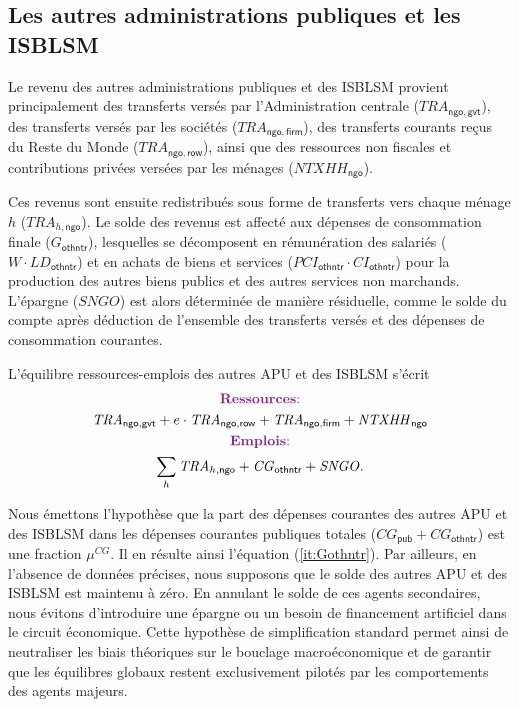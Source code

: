 \documentclass[11pt,a4paper]{article}
\newcommand{\gvt}{\mathsf{gvt}}
\newcommand{\firm}{\mathsf{firm}}
\newcommand{\ngo}{\mathsf{ngo}}
\newcommand{\row}{\mathsf{row}}
\newcommand{\CI}{\mathit{CI}}
\newcommand{\CG}{\mathit{CG}}
\newcommand{\NTXHH}{\mathit{NTXHH}}
\newcommand{\LD}{\mathit{LD}}
\newcommand{\othntr}{\mathsf{othntr}}
\newcommand{\SNGO}{\mathit{SNGO}}
\newcommand{\PCI}{\mathit{PCI}}
\newcommand{\TRA}{\mathit{TRA}}
\newcommand{\pub}{\mathsf{pub}}
\newcommand{\TR}{\mathit{TRA}}
\begin{document}
	\subsection{Les autres administrations publiques et les ISBLSM}
	Le revenu des autres administrations publiques et des ISBLSM provient principalement des transferts versés par l'Administration centrale ($\TR_{\ngo,\gvt}$), des transferts versés par les sociétés ($\TR_{\ngo,\firm}$), des transferts courants reçus du Reste du Monde ($\TR_{\ngo,\row}$), ainsi que des ressources non fiscales et contributions privées versées par les ménages ($\NTXHH_{\ngo}$).
	
	Ces revenus sont ensuite redistribués sous forme de transferts vers chaque ménage $h$ ($\TRA_{h,\ngo}$). Le solde des revenus est affecté aux dépenses de consommation finale ($G_{\othntr}$), lesquelles se décomposent en rémunération des salariés ($W\cdot\LD_{\othntr}$) et en achats de biens et services ($\PCI_{\othntr}\cdot\CI_{\othntr}$) pour la production des autres biens publics et des autres services non marchands. L'épargne ($\SNGO$) est alors déterminée de manière résiduelle, comme le solde du compte après déduction de l'ensemble des transferts versés et des dépenses de consommation courantes.
	
	L'équilibre ressources-emplois des autres APU et des ISBLSM s'écrit
	\begin{gather}
		\centerline{\textcolor{Fuchsia}{\textbf{Ressources}:}} \notag\\
		\TR_{\ngo,\gvt}+ e\cdot\TR_{\ngo,\row} +\TR_{\ngo,\firm} + \NTXHH_{\ngo} \notag\\
		\centerline{\textcolor{Fuchsia}{\textbf{Emplois}:}} \notag\\
		\sum_{h}\TR_{h,\ngo} + \CG_{\othntr} + \SNGO.\notag
	\end{gather}	
	
	Nous émettons l'hypothèse que la part des dépenses courantes des autres APU et des ISBLSM dans les dépenses courantes publiques totales ($\CG_\pub + \CG_\othntr$) est une fraction $\mu^{\CG}$. Il en résulte ainsi l'équation (\ref{it:Gothntr}). Par ailleurs, en l'absence de données précises, nous supposons que le solde des autres APU et des ISBLSM est maintenu à zéro. En annulant le solde de ces agents secondaires, nous évitons d'introduire une épargne ou un besoin de financement artificiel dans le circuit économique. Cette hypothèse de simplification standard permet ainsi de neutraliser les biais théoriques sur le bouclage macroéconomique et de garantir que les équilibres globaux restent exclusivement pilotés par les comportements des agents majeurs.
	
\end{document}
